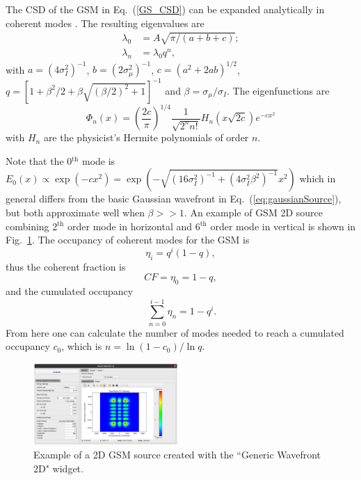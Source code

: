 \documentclass{iopconfser}
\begin{document}
The CSD of the GSM in Eq.~(\ref{GS_CSD}) can be expanded analytically in coherent modes \cite{Starikov82}. The resulting eigenvalues are
\begin{align}
\lambda_0 &= A \sqrt{\pi/( a+b+c)}; \\ 
\lambda_n &= \lambda_0 q ^n,
\end{align}
with $a = (4 \sigma_I^2)^{-1}$, $ 
b = (2 \sigma_{\mu}^2)^{-1}$, $ 
c = (a^2 + 2 a b)^{1/2}$,
$q = [1 + \beta^2/2 + \beta\sqrt{(\beta/2)^2+1}]^{-1}$ 
and $\beta=\sigma_{\mu}/\sigma_I$.
The eigenfunctions are
\begin{equation}
\Phi_n(x) = \left( \frac{2c}{\pi} \right)^{1/4} \frac{1}{\sqrt{2^n n!}} H_n(x\sqrt{2c})e^{-cx^2}
\label{GSeigenvalues}
\end{equation}
with $H_n$ are the physicist's Hermite polynomials of order $n$. 

Note that the 0$^\text{th}$ mode is $E_0(x) \propto \exp(-c x^2) = \exp(-\sqrt{(16 \sigma_I^2)^{-1} + (4 \sigma_I^2 \beta^2)^{-1}} x^2)$ which in general differs from the basic Gaussian wavefront in Eq.~(\ref{eq:gaussianSource}), but both approximate well when $\beta>>1$. An example of GSM 2D source combining 2$^\text{th}$ order mode in horizontal and 6$^\text{th}$ order mode in vertical is shown in Fig.~\ref{fig:GSM2D}.
The occupancy of coherent modes for the GSM is   
\begin{equation}\label{eq:GSMoccupancy}
\eta_i = q^i(1-q), 
\end{equation}
thus the coherent fraction is 
\begin{equation}\label{eq:GSMcoherentfraction}
    CF=\eta_0=1-q,
\end{equation}
and the cumulated occupancy
\begin{equation}\label{eq:GSMcumulatedoccupancy}
\ \sum_{n=0}^{i-1} \eta_n = 1-q^i.
\end{equation}
From here one can calculate the number of modes needed to reach a cumulated occupancy $c_0$, which is $n=\ln(1-c_0)/\ln q$.

\begin{figure}
    \centering
    \includegraphics[width=0.49\textwidth]{figures/GSM2D.png}
        
    \caption{Example of a 2D GSM source created with the ``Generic Wavefront 2D" widget.}
    \label{fig:GSM2D}
\end{figure}
\end{document}

